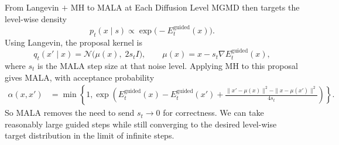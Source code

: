\documentclass[aspectratio=169,11pt]{beamer}
\begin{document}
 \begin{frame}{From Langevin $+$ MH to MALA at Each Diffusion Level}
 \small
 MGMD then targets the level-wise density
 \[
 p_t(x\mid s)\propto \exp\!\bigl(-E_t^{\mathrm{guided}}(x)\bigr).
 \]
 Using Langevin, the proposal kernel is
 \[
 q_t(x'\mid x)=\mathcal{N}\!\bigl(\mu(x),\; 2s_t I\bigr),\qquad \mu(x)=x-s_t\nabla E_t^{\mathrm{guided}}(x),
 \]
 where $s_t$ is the MALA step size at that noise level. Applying MH to this proposal gives MALA, with acceptance probability
 \[
 \begin{aligned}
\alpha(x,x')&=\min\!\left\{1,\exp\!\left(E_t^{\mathrm{guided}}(x)-E_t^{\mathrm{guided}}(x')\right.
 + \left.\frac{\|x'-\mu(x)\|^2-\|x-\mu(x')\|^2}{4s_t}\right)\right\}.
\end{aligned}
\]
So MALA removes the need to send $s_t\to 0$ for correctness. We can take reasonably large guided steps while still converging to the desired level-wise target distribution in the limit of infinite steps.
\end{frame}
\end{document}
